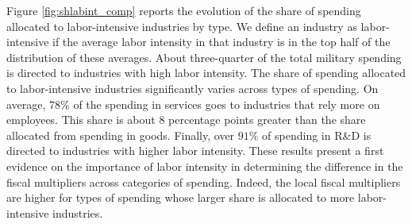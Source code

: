\documentclass[dv_diss_main.tex]{subfiles}
\begin{document}
Figure \ref{fig:shlabint_comp} reports the evolution of the share of spending allocated to labor-intensive industries by type. We define an industry as labor-intensive if the average labor intensity in that industry is in the top half of the distribution of these averages. About three-quarter of the total military spending is directed to industries with high labor intensity. The share of spending allocated to labor-intensive industries significantly varies across types of spending. On average, $78\%$ of the spending in services goes to industries that rely more on employees. This share is about $8$ percentage points greater than the share allocated from spending in goods. Finally, over $91\%$ of spending in R\&D is directed to industries with higher labor intensity. These results present a first evidence on the importance of labor intensity in determining the difference in the fiscal multipliers across categories of spending. Indeed, the local fiscal multipliers are higher for types of spending whose larger share is allocated to more labor-intensive industries.
\end{document}
